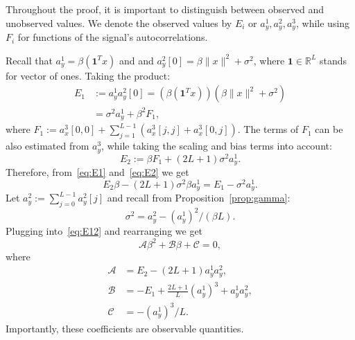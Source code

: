\documentclass[english,11pt]{article}
\newcommand{\1}{\mathbf{1}}
\numberwithin{equation}{section}
\theoremstyle{plain}
\theoremstyle{definition}
\theoremstyle{remark}
\theoremstyle{plain}
\theoremstyle{remark}
\theoremstyle{plain}
\theoremstyle{plain}
\newcommand{\RL}{\mathbb{R}^L}
\newcommand{\one}{\mathbf{1}}
\begin{document}
Throughout the proof, it is important to distinguish between observed and unobserved values. 
We denote the observed values by $E_i$ or $a_y^1,a_y^2,a_y^3$, while using $F_i$ for functions of the signal's autocorrelations. 

Recall that $a_y^1 = \beta(\one^Tx)$ and  
and $a_y^2[0] = \beta\|x\|^2+\sigma^2$, where $\one\in\RL$ stands for vector of ones. Taking the product:
\begin{equation}\label{eq:E1}
\begin{split}
E_1 &:= a_y^1a_y^2[0] =  (\beta(\one^Tx))(\beta\|x\|^2+\sigma^2) \\
& = \sigma^2a_y^1 + \beta^2F_1,
\end{split}
\end{equation}
where $F_1 := a_x^3[0,0] + \sum_{j=1}^{L-1}(a_x^3[j,j] + a_x^3[0,j])$. 
The terms of $F_1$ can be also estimated from $a_y^3$, while taking the scaling and bias terms into account:
\begin{equation} \label{eq:E2}
E_2:= \beta F_1 + (2L+1)\sigma^2a_y^1.
\end{equation}
Therefore, from~\eqref{eq:E1} and~\eqref{eq:E2} we get
\begin{equation} \label{eq:E12}
E_2\beta -(2L+1)\sigma^2\beta a_y^1 = E_1-\sigma^2a_y^1.
\end{equation}
Let $a_y^2:=\sum_{j=0}^{L-1}a_y^2[j]$ and recall from Proposition~\ref{prop:gamma}:
\begin{equation} \label{eq:sigma2}
\sigma^2 = a_y^2 - (a^1_y)^2/(\beta L). 
\end{equation} 
Plugging into~\eqref{eq:E12} and rearranging we get 
\begin{equation} \label{eq:quad1}
\mathcal{A}\beta^2 + \mathcal{B}\beta + \mathcal{C} = 0,
\end{equation}
where 
\begin{align*}
\mathcal{A} &= E_2 - (2L+1)a_y^1a_y^2, \\ 
\mathcal{B} &= -E_1 + \frac{2L+1}{L}(a_y^1)^3 + a_y^1a_y^2  , \\
\mathcal{C} &= -(a_y^1)^3/L.
\end{align*}
Importantly, these coefficients are observable quantities. 
\end{document}
